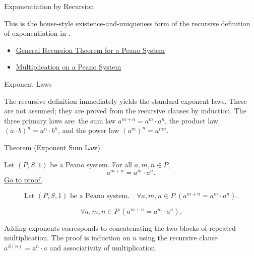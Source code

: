 \begin{topicbox}{Exponentiation by Recursion}
\begin{remark*}[Interpretation]
This is the house-style existence-and-uniqueness form of the recursive
definition of exponentiation in \citep{FefermanNumberSystems1964}.
\end{remark*}

\begin{dependencies}
\begin{itemize}
  \item \hyperref[thm:general-recursion-theorem-for-peano-system]{General Recursion Theorem for a Peano System}
  \item \hyperref[def:multiplication-on-peano-system]{Multiplication on a Peano System}
\end{itemize}
\end{dependencies}
\end{topicbox}

\begin{topicbox}{Exponent Laws}
\begin{exposition}
The recursive definition immediately yields the standard exponent laws.
These are not assumed; they are proved from the recursive clauses by induction.
The three primary laws are: the sum law $a^{m+n} = a^m \cdot a^n$, the
product law $(a \cdot b)^n = a^n \cdot b^n$, and the power law $(a^m)^n =
a^{mn}$.
\end{exposition}

\begin{theorembox}{Theorem (Exponent Sum Law)}
\begin{theorem}
\label{thm:exponent-sum-law}
Let $(P,S,1)$ be a Peano system. For all $a,m,n \in P$,
\[
a^{m+n} = a^m \cdot a^n.
\]
\hyperref[prf:exponent-sum-law]{Go to proof.}
\end{theorem}
\end{theorembox}

\begin{remark*}
\[
\text{Let } (P,S,1) \text{ be a Peano system.}\quad
\forall a,m,n \in P\;(a^{m+n} = a^m \cdot a^n).
\]
\end{remark*}

\begin{remark*}
\[
\forall a,m,n \in P\;(a^{m+n} = a^m \cdot a^n).
\]
\end{remark*}

\begin{remark*}[Interpretation]
Adding exponents corresponds to concatenating the two blocks of repeated
multiplication. The proof is induction on $n$ using the recursive clause
$a^{S(n)} = a^n \cdot a$ and associativity of multiplication.
\end{remark*}


\end{topicbox}
